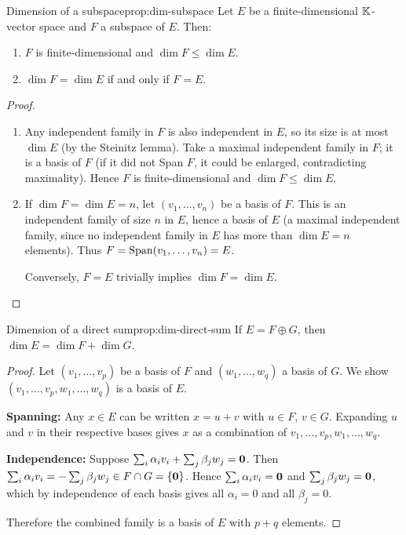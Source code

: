\begin{proposition}{Dimension of a subspace}{prop:dim-subspace}
Let $E$ be a finite-dimensional ${\mathbb{K}}$-vector space and $F$ a subspace of
$E$. Then:
\begin{enumerate}[label=(\roman*)]
  \item $F$ is finite-dimensional and $\dim F\leq\dim E$.
  \item $\dim F = \dim E$ if and only if $F = E$.
\end{enumerate}
\end{proposition}

\begin{proof}
\begin{enumerate}[label=(\roman*)]
  \item Any independent family in $F$ is also independent in $E$, so its
    size is at most $\dim E$ (by the Steinitz lemma). Take a maximal
    independent family in $F$; it is a basis of $F$ (if it did not Span
    $F$, it could be enlarged, contradicting maximality). Hence $F$ is
    finite-dimensional and $\dim F\leq\dim E$.

  \item If $\dim F = \dim E = n$, let $(v_1,\ldots,v_n)$ be a basis
    of $F$. This is an independent family of size $n$ in $E$, hence a
    basis of $E$ (a maximal independent family, since no independent
    family in $E$ has more than $\dim E = n$ elements). Thus
    $F = \operatorname{Span}(v_1,\ldots,v_n) = E$.

    Conversely, $F = E$ trivially implies $\dim F = \dim E$. \qedhere
\end{enumerate}
\end{proof}

\begin{proposition}{Dimension of a direct sum}{prop:dim-direct-sum}
If $E = F\oplus G$, then $\dim E = \dim F + \dim G$.
\end{proposition}

\begin{proof}
Let $(v_1,\ldots,v_p)$ be a basis of $F$ and $(w_1,\ldots,w_q)$ a basis
of $G$. We show $(v_1,\ldots,v_p,w_1,\ldots,w_q)$ is a basis of $E$.

\textbf{Spanning:} Any $x\in E$ can be written $x = u + v$ with $u\in F$,
$v\in G$. Expanding $u$ and $v$ in their respective bases gives $x$ as a
combination of $v_1,\ldots,v_p,w_1,\ldots,w_q$.

\textbf{Independence:} Suppose
$\sum_i\alpha_i v_i + \sum_j\beta_j w_j = \mathbf{0}$. Then
$\sum_i\alpha_iv_i = -\sum_j\beta_jw_j\in F\cap G = \left\{\mathbf{0}\right\}$.
Hence $\sum_i\alpha_iv_i = \mathbf{0}$ and $\sum_j\beta_jw_j = \mathbf{0}$,
which by independence of each basis gives all $\alpha_i = 0$ and all
$\beta_j = 0$.

Therefore the combined family is a basis of $E$ with $p+q$ elements.
\end{proof}

